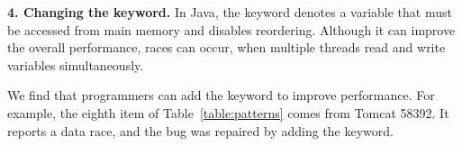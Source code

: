 











\noindent
\textbf{4. Changing the  keyword.} In Java, the  keyword denotes a variable that must be accessed from main memory and disables reordering. Although it can improve the overall performance, races can occur, when multiple threads read and write  variables simultaneously.

We find that programmers can add the  keyword to improve performance. For example, the eighth item of Table~\ref{table:patterns} comes from Tomcat 58392. It reports a data race, and the bug was repaired by adding the  keyword.


